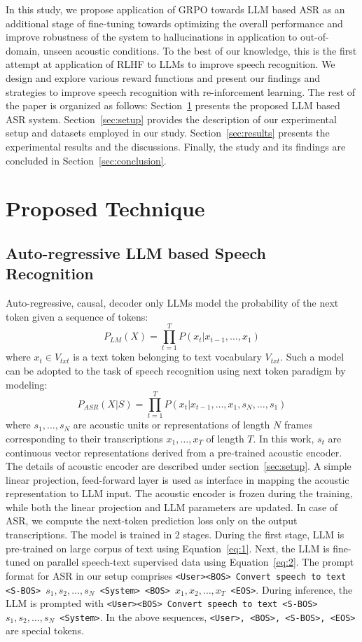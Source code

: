 \documentclass[conference]{IEEEtran}
\begin{document}
In this study, we propose application of GRPO towards LLM based ASR as an additional stage of fine-tuning towards optimizing the overall performance and improve robustness of the system to hallucinations in application to out-of-domain, unseen acoustic conditions.
To the best of our knowledge, this is the first attempt at application of RLHF to LLMs to improve speech recognition.
We design and explore various reward functions and present our findings and strategies to improve speech recognition with re-inforcement learning.
The rest of the paper is organized as follows: Section~\ref{sec:technique} presents the proposed LLM based ASR system.
Section~\ref{sec:setup} provides the description of our experimental setup and datasets employed in our study.
Section~\ref{sec:results} presents the experimental results and the discussions.
Finally, the study and its findings are concluded in Section~\ref{sec:conclusion}.


\section{Proposed Technique}\label{sec:technique}
\subsection{Auto-regressive LLM based Speech Recognition}
Auto-regressive, causal, decoder only LLMs model the probability of the next token given a sequence of tokens:
\begin{equation}\label{eq:1}
P_{LM}(X) = \prod_{t=1}^{T} P(x_t|x_{t-1},\ldots,x_1)
\end{equation}
where $x_t \in V_{txt}$ is a text token belonging to text vocabulary $V_{txt}$.
Such a model can be adopted to the task of speech recognition using next token paradigm by modeling:
\begin{equation}\label{eq:2}
P_{ASR}(X|S) = \prod_{t=1}^{T} P(x_t|x_{t-1},\ldots,x_1, s_N,\ldots,s_1) 
\end{equation}
where $s_1,\ldots,s_N$ are acoustic units or representations of length $N$ frames corresponding to their transcriptions $x_1,\ldots,x_T$ of length $T$.
In this work, $s_t$ are continuous vector representations derived from a pre-trained acoustic encoder.
The details of acoustic encoder are described under section~\ref{sec:setup}.
A simple linear projection, feed-forward layer is used as interface in mapping the acoustic representation to LLM input.
The acoustic encoder is frozen during the training, while both the linear projection and LLM parameters are updated.
In case of ASR, we compute the next-token prediction loss only on the output transcriptions.
The model is trained in 2 stages.
During the first stage, LLM is pre-trained on large corpus of text using Equation~\ref{eq:1}.
Next, the LLM is fine-tuned on parallel speech-text supervised data using Equation~\ref{eq:2}.
The prompt format for ASR in our setup comprises \texttt{<User><BOS> Convert speech to text <S-BOS> $s_1, s_2, \ldots, s_N$ <System> <BOS> $x_1, x_2, \ldots, x_T$ <EOS>}.
During inference, the LLM is prompted with \texttt{<User><BOS> Convert speech to text <S-BOS> $s_1, s_2, \ldots, s_N$ <System>}.
In the above sequences, \texttt{<User>, <BOS>, <S-BOS>, <EOS>} are special tokens.
\end{document}
